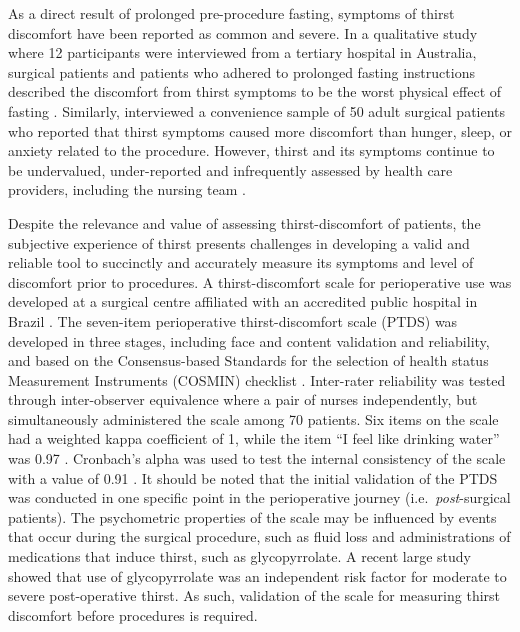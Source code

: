 \documentclass[12pt,twoside,]{pinp}
\begin{document}
As a direct result of prolonged pre-procedure fasting, symptoms of
thirst discomfort have been reported as common and severe. In a
qualitative study where 12 participants were interviewed from a tertiary
hospital in Australia, surgical patients and patients who adhered to
prolonged fasting instructions described the discomfort from thirst
symptoms to be the worst physical effect of fasting
\citep{carey2015qualitative}. Similarly, \citep{madsen1998perioperative}
interviewed a convenience sample of 50 adult surgical patients who
reported that thirst symptoms caused more discomfort than hunger, sleep,
or anxiety related to the procedure. However, thirst and its symptoms
continue to be undervalued, under-reported and infrequently assessed by
health care providers, including the nursing team
\citep{milani2016thirst}.

Despite the relevance and value of assessing thirst-discomfort of
patients, the subjective experience of thirst presents challenges in
developing a valid and reliable tool to succinctly and accurately
measure its symptoms and level of discomfort prior to procedures. A
thirst-discomfort scale for perioperative use was developed at a
surgical centre affiliated with an accredited public hospital in Brazil
\citep{Martins_2017}. The seven-item perioperative thirst-discomfort
scale (PTDS) was developed in three stages, including face and content
validation and reliability, and based on the Consensus-based Standards
for the selection of health status Measurement Instruments (COSMIN)
checklist \citep{mokkink2010cosmin}. Inter-rater reliability was tested
through inter-observer equivalence where a pair of nurses independently,
but simultaneously administered the scale among 70 patients. Six items
on the scale had a weighted kappa coefficient of 1, while the item ``I
feel like drinking water'' was 0.97 \citep{Martins_2017}. Cronbach's
alpha was used to test the internal consistency of the scale with a
value of 0.91 \citep{Martins_2017}. It should be noted that the initial
validation of the PTDS was conducted in one specific point in the
perioperative journey (i.e.~\emph{post}-surgical patients). The
psychometric properties of the scale may be influenced by events that
occur during the surgical procedure, such as fluid loss and
administrations of medications that induce thirst, such as
glycopyrrolate. A recent large study showed that use of glycopyrrolate
was an independent risk factor for moderate to severe post-operative
thirst.\citep{lee2020prevalence} As such, validation of the scale for
measuring thirst discomfort before procedures is required.
\end{document}
